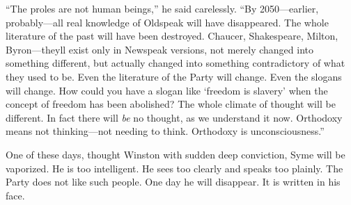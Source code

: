 ``The proles are not human beings,'' he said carelessly. ``By
2050---earlier, probably---all real knowledge of Oldspeak will have
disappeared. The whole literature of the past will have been destroyed.
Chaucer, Shakespeare, Milton, Byron---they\textquotesingle ll exist only in
Newspeak versions, not merely changed into something different, but actually
changed into something contradictory of what they used to be. Even the
literature of the Party will change. Even the slogans will change. How could
you have a slogan like `freedom is slavery' when the concept of freedom has
been abolished? The whole climate of thought will be different. In fact
there will \emph{be} no thought, as we understand it now. Orthodoxy means
not thinking---not needing to think. Orthodoxy is unconsciousness.''

One of these days, thought Winston with sudden deep conviction, Syme
will be vaporized. He is too intelligent. He sees too clearly and speaks
too plainly. The Party does not like such people. One day he will
disappear. It is written in his face.

